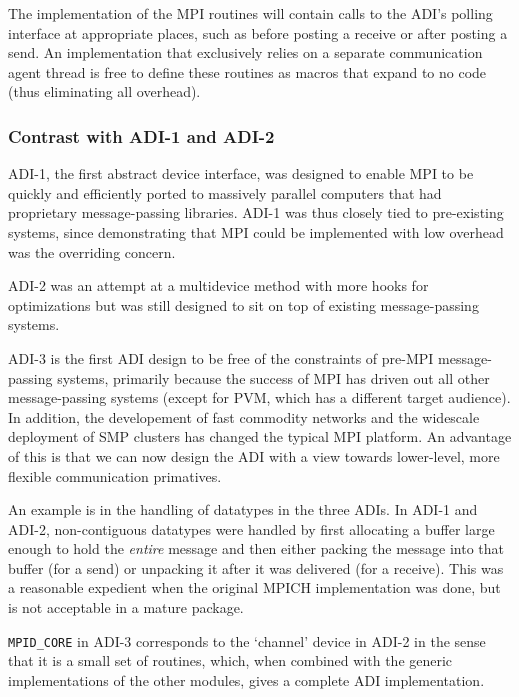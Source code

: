 \documentclass{article}
\begin{document}
The implementation of the MPI routines will contain calls to the ADI's
polling interface at appropriate places, such as before posting a
receive or after posting a send.  An implementation that exclusively
relies on a separate communication agent thread is free to define
these routines as macros that expand to no code (thus eliminating all
overhead). 

\subsubsection{Contrast with ADI-1 and ADI-2}
\label{sec-historical}

ADI-1, the first abstract device interface, was designed to enable MPI
to be quickly and efficiently ported to massively parallel computers
that had proprietary message-passing libraries.  ADI-1 was thus
closely tied to pre-existing systems, since demonstrating that MPI
could be implemented with low overhead was the overriding concern.

ADI-2 was an attempt at a multidevice method with more hooks for
optimizations but was still designed to sit on top of existing
message-passing systems.  

ADI-3 is the first ADI design to be free of the constraints of pre-MPI
message-passing systems, primarily because the success of MPI has
driven out all other message-passing systems (except for PVM, which
has a different target audience).  In addition, the developement of
fast commodity networks and the widescale deployment of SMP clusters
has changed the typical MPI platform.  An advantage of this is that we
can now design the ADI with a view towards lower-level, more flexible
communication primatives. 

An example is in the handling of datatypes in the three ADIs.
In ADI-1 and ADI-2, non-contiguous datatypes were handled by first
allocating a buffer large enough to hold the \emph{entire} message and
then either packing the message into that buffer (for a send) or
unpacking it after it was delivered (for a receive).  This was a
reasonable expedient when the original MPICH implementation was done,
but is not acceptable in a mature package.

\texttt{MPID_CORE} in ADI-3 corresponds to the `channel' device in ADI-2 in
the sense that it is a small set of routines, which, when combined with the
generic implementations of the other modules, gives a complete ADI
implementation.  
\end{document}
